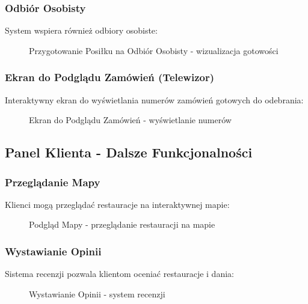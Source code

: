 \documentclass[12pt,a4paper,utf-8]{article}
\begin{document}
\subsubsection{Odbiór Osobisty}

System wspiera również odbiory osobiste:

\begin{figure}[H]
    \centering
    \caption{Przygotowanie Posiłku na Odbiór Osobisty  -  wizualizacja gotowości}
    \label{fig:pickup_preparation}
\end{figure}

\subsubsection{Ekran do Podglądu Zamówień (Telewizor)}

Interaktywny ekran do wyświetlania numerów zamówień gotowych do odebrania:

\begin{figure}[H]
    \centering
    \caption{Ekran do Podglądu Zamówień  -  wyświetlanie numerów}
    \label{fig:display_screen}
\end{figure}

\subsection{Panel Klienta - Dalsze Funkcjonalności}

\subsubsection{Przeglądanie Mapy}

Klienci mogą przeglądać restauracje na interaktywnej mapie:

\begin{figure}[H]
    \centering
    \caption{Podgląd Mapy  -  przeglądanie restauracji na mapie}
    \label{fig:map_view}
\end{figure}

\subsubsection{Wystawianie Opinii}

Sistema recenzji pozwala klientom oceniać restauracje i dania:

\begin{figure}[H]
    \centering
    \caption{Wystawianie Opinii  -  system recenzji}
    \label{fig:reviews}
\end{figure}
\end{document}
